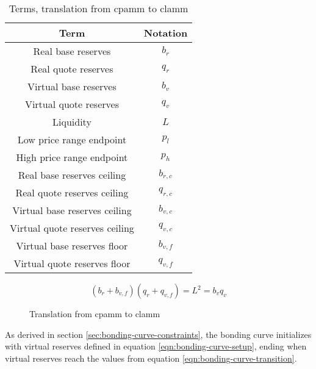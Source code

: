 \documentclass[table, twocolumn]{article}
\begin{document}
\begin{table}[!htb]
  \centering
  \begin{tabular}{|c|c|}
    \hline \rowcolor{blue}
    Term                           & Notation  \\ \hline
    Real base reserves             & $b_r$     \\ \hline
    Real quote reserves            & $q_r$     \\ \hline
    Virtual base reserves          & $b_v$     \\ \hline
    Virtual quote reserves         & $q_v$     \\ \hline
    Liquidity                      & $L$       \\ \hline
    Low price range endpoint       & $p_l$     \\ \hline
    High price range endpoint      & $p_h$     \\ \hline
    Real base reserves ceiling     & $b_{r,c}$ \\ \hline
    Real quote reserves ceiling    & $q_{r,c}$ \\ \hline
    Virtual base reserves ceiling  & $b_{v,c}$ \\ \hline
    Virtual quote reserves ceiling & $q_{v,c}$ \\ \hline
    Virtual base reserves floor    & $b_{v,f}$ \\ \hline
    Virtual quote reserves floor   & $q_{v,f}$ \\ \hline
  \end{tabular}
  \caption{Terms, translation from \gls{cpamm} to \gls{clamm}}
  \label{tab:clamm-curve-translation}
\end{table}

\begin{equation} \label{eqn:clamm-curve-translation}
  (b_r + b_{v, f})(q_r + q_{v, f}) = L^2 = b_v q_v
\end{equation}

\begin{figure}[!htb]
  \centering
  
  \caption{Translation from \gls{cpamm} to \gls{clamm}}
  \label{fig:clamm-curve-translation}
\end{figure}

As derived in section \ref{sec:bonding-curve-constraints}, the bonding curve initializes
with virtual reserves defined in equation \ref{eqn:bonding-curve-setup}, ending when
virtual reserves reach the values from equation \ref{eqn:bonding-curve-transition}.
\end{document}
